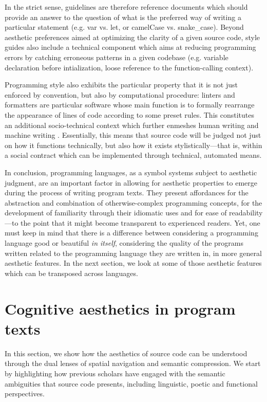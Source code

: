 In the strict sense, guidelines are therefore reference documents which should provide an answer to the question of what is the preferred way of writing a particular statement (e.g. var vs. let, or camelCase vs. snake\_case). Beyond aesthetic preferences aimed at optimizing the clarity of a given source code, style guides also include a technical component which aims at reducing programming errors by catching erroneous patterns in a given codebase (e.g. variable declaration before intialization, loose reference to the function-calling context).

Programming style also exhibits the particular property that it is not just enforced by convention, but also by computational procedure: linters and formatters are particular software whose main function is to formally rearrange the appearance of lines of code according to some preset rules. This constitutes an additional socio-technical context which further enmeshes human writing and machine writing \citep{depaz_discursive_2022}. Essentially, this means that source code will be judged not just on how it functions technically, but also how it exists stylistically—that is, within a social contract which can be implemented through technical, automated means.

\spacersmall

In conclusion, programming languages, as a symbol systems subject to aesthetic judgment, are an important factor in allowing for aesthetic properties to emerge during the process of writing program texts. They present affordances for the abstraction and combination of otherwise-complex programming concepts, for the development of familiarity through their idiomatic uses and for ease of readability—to the point that it might become transparent to experienced readers. Yet, one must keep in mind that there is a difference between considering a programming language good or beautiful \emph{in itself}, considering the quality of the programs written related to the programming language they are written in, in more general aesthetic features. In the next section, we look at some of those aesthetic features which can be transposed across languages.

\section{Cognitive aesthetics in program texts}
\label{sec:cognitive-aesthetics}

In this section, we show how the aesthetics of source code can be understood through the dual lenses of spatial navigation and semantic compression. We start by highlighting how previous scholars have engaged with the semantic ambiguities that source code presents, including linguistic, poetic and functional perspectives.

